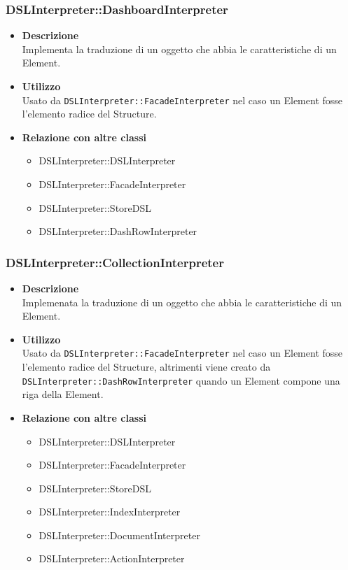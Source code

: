 \subsubsection{DSLInterpreter::DashboardInterpreter}
\begin{itemize}
\item \textbf{Descrizione} \hfill \\
Implementa la traduzione di un oggetto che abbia le caratteristiche di un  Element.
\item \textbf{Utilizzo} \hfill \\
Usato da \texttt{DSLInterpreter::FacadeInterpreter} nel caso un  Element fosse l'elemento radice del  Structure. 
\item \textbf{Relazione con altre classi}
\begin{itemize}
\item DSLInterpreter::DSLInterpreter
\item DSLInterpreter::FacadeInterpreter
\item DSLInterpreter::StoreDSL
\item DSLInterpreter::DashRowInterpreter
\end{itemize}
\end{itemize}

\subsubsection{DSLInterpreter::CollectionInterpreter}
\begin{itemize}
\item \textbf{Descrizione} \hfill \\
Implemenata la traduzione di un oggetto che abbia le caratteristiche di un  Element.
\item \textbf{Utilizzo} \hfill \\
  Usato da \texttt{DSLInterpreter::FacadeInterpreter} \newline nel caso un  Element fosse l'elemento radice del  Structure, altrimenti viene creato da \texttt{DSLInterpreter::DashRowInterpreter} \newline quando un  Element compone una riga della  Element.
\item \textbf{Relazione con altre classi}
\begin{itemize}
\item DSLInterpreter::DSLInterpreter
\item DSLInterpreter::FacadeInterpreter
\item DSLInterpreter::StoreDSL
\item DSLInterpreter::IndexInterpreter
\item DSLInterpreter::DocumentInterpreter
\item DSLInterpreter::ActionInterpreter
\end{itemize}
\end{itemize}

